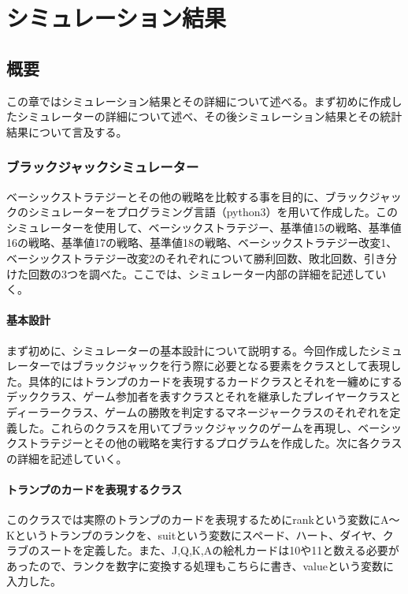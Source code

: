 \chapter{シミュレーション結果}
\section{概要}
この章ではシミュレーション結果とその詳細について述べる。まず初めに作成したシミュレーターの詳細について述べ、その後シミュレーション結果とその統計結果について言及する。

\subsection{ブラックジャックシミュレーター}
ベーシックストラテジーとその他の戦略を比較する事を目的に、ブラックジャックのシミュレーターをプログラミング言語（python3）を用いて作成した。このシミュレーターを使用して、ベーシックストラテジー、基準値15の戦略、基準値16の戦略、基準値17の戦略、基準値18の戦略、ベーシックストラテジー改変1、ベーシックストラテジー改変2のそれぞれについて勝利回数、敗北回数、引き分けた回数の3つを調べた。ここでは、シミュレーター内部の詳細を記述していく。

\subsubsection{基本設計}
まず初めに、シミュレーターの基本設計について説明する。今回作成したシミュレーターではブラックジャックを行う際に必要となる要素をクラスとして表現した。具体的にはトランプのカードを表現するカードクラスとそれを一纏めにするデッククラス、ゲーム参加者を表すクラスとそれを継承したプレイヤークラスとディーラークラス、ゲームの勝敗を判定するマネージャークラスのそれぞれを定義した。これらのクラスを用いてブラックジャックのゲームを再現し、ベーシックストラテジーとその他の戦略を実行するプログラムを作成した。次に各クラスの詳細を記述していく。

\subsubsection{トランプのカードを表現するクラス}
このクラスでは実際のトランプのカードを表現するためにrankという変数にA～Kというトランプのランクを、suitという変数にスペード、ハート、ダイヤ、クラブのスートを定義した。また、J,Q,K,Aの絵札カードは10や11と数える必要があったので、ランクを数字に変換する処理もこちらに書き、valueという変数に入力した。


